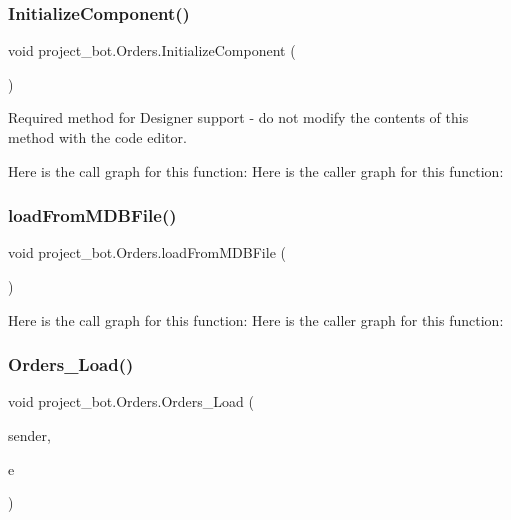 \subsubsection{\texorpdfstring{Initialize\+Component()}{InitializeComponent()}}
{\footnotesize\ttfamily void project\+\_\+bot.\+Orders.\+Initialize\+Component (\begin{DoxyParamCaption}{ }\end{DoxyParamCaption})\hspace{0.3cm}{\ttfamily [private]}}



Required method for Designer support -\/ do not modify the contents of this method with the code editor. 

Here is the call graph for this function\+:
Here is the caller graph for this function\+:
\mbox{\label{classproject__bot_1_1_orders_a17069582eaf0396d663e03d59208f71f}} 
\subsubsection{\texorpdfstring{load\+From\+M\+D\+B\+File()}{loadFromMDBFile()}}
{\footnotesize\ttfamily void project\+\_\+bot.\+Orders.\+load\+From\+M\+D\+B\+File (\begin{DoxyParamCaption}{ }\end{DoxyParamCaption})}

Here is the call graph for this function\+:
Here is the caller graph for this function\+:
\mbox{\label{classproject__bot_1_1_orders_a5f7d269f76edc56e956c62726c541334}} 
\subsubsection{\texorpdfstring{Orders\+\_\+\+Load()}{Orders\_Load()}}
{\footnotesize\ttfamily void project\+\_\+bot.\+Orders.\+Orders\+\_\+\+Load (\begin{DoxyParamCaption}\item[{object}]{sender,  }\item[{Event\+Args}]{e }\end{DoxyParamCaption})\hspace{0.3cm}{\ttfamily [private]}}


